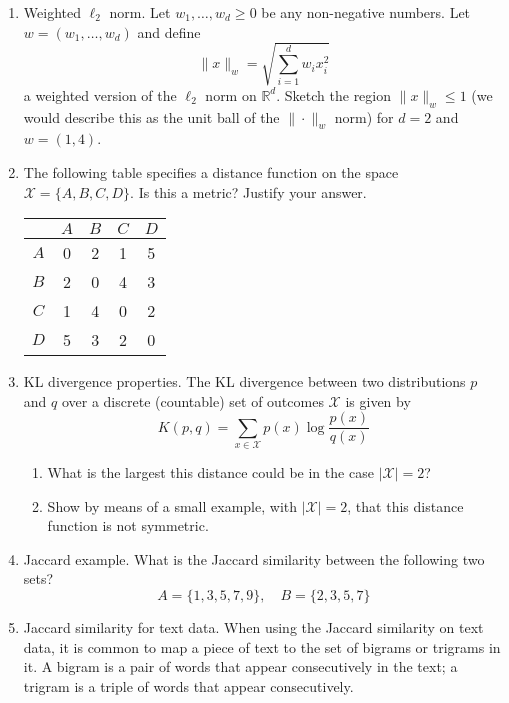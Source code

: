 \documentclass{article}
\begin{document}
\begin{enumerate}
\item Weighted $\ell_{2}$ norm. Let $w_{1}, \ldots, w_{d} \geq 0$ be any non-negative numbers. Let $w=\left(w_{1}, \ldots, w_{d}\right)$ and define
    \[
    \|x\|_{w}=\sqrt{\sum_{i=1}^{d} w_{i} x_{i}^{2}}
    \]
    a weighted version of the $\ell_{2}$ norm on $\mathbb{R}^{d}$. Sketch the region $\|x\|_{w} \leq 1$ (we would describe this as the unit ball of the $\|\cdot\|_{w}$ norm) for $d=2$ and $w=(1,4)$.

\item The following table specifies a distance function on the space $\mathcal{X}=\{A, B, C, D\}$. Is this a metric? Justify your answer.

    \begin{table}[h]
    \centering
    \begin{tabular}{c|cccc}
    & $A$ & $B$ & $C$ & $D$ \\
    \hline
    $A$ & 0 & 2 & 1 & 5 \\
    $B$ & 2 & 0 & 4 & 3 \\
    $C$ & 1 & 4 & 0 & 2 \\
    $D$ & 5 & 3 & 2 & 0
    \end{tabular}
    \end{table}

\item KL divergence properties. The KL divergence between two distributions $p$ and $q$ over a discrete (countable) set of outcomes $\mathcal{X}$ is given by
    \[
    K(p, q)=\sum_{x \in \mathcal{X}} p(x) \log \frac{p(x)}{q(x)}
    \]
    \begin{enumerate}
    \item What is the largest this distance could be in the case $|\mathcal{X}|=2$?
    \item Show by means of a small example, with $|\mathcal{X}|=2$, that this distance function is not symmetric.
    \end{enumerate}

\item Jaccard example. What is the Jaccard similarity between the following two sets?
    \[
    A=\{1,3,5,7,9\}, \quad B=\{2,3,5,7\}
    \]

\item Jaccard similarity for text data. When using the Jaccard similarity on text data, it is common to map a piece of text to the set of bigrams or trigrams in it. A bigram is a pair of words that appear consecutively in the text; a trigram is a triple of words that appear consecutively.


\end{enumerate}
\end{document}

